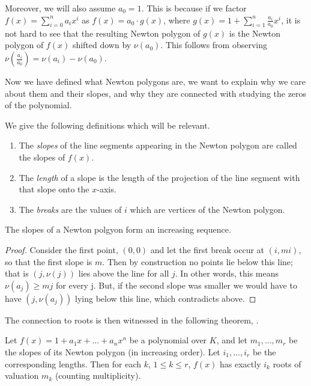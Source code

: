 Moreover, we will also assume $a_0 = 1$. This is because if we factor
$f(x) = \sum_{i = 0}^n a_i x^i$ as $f(x) = a_0 \cdot g(x)$, where
$ g(x) = 1 + \sum_{i=1}^n \frac{a_i}{a_0}x^i$, it is not hard to see that the resulting Newton
polygon of $g(x)$ is the Newton polygon of $f(x)$ shifted down by $\nu (a_0)$.
This follows from observing $\nu (\frac{a_i}{a_0}) = \nu(a_i) - \nu (a_0)$.

Now we have defined what Newton polygons are, we want to explain why we care about them and their
slopes, and why they are connected with studying the zeros of the polynomial.

We give the following definitions which will be relevant.
\begin{definition}
    \begin{enumerate}
        \item The \emph{slopes} of the line segments appearing in the Newton polygon are called the
        slopes of $f(x)$.
        \item The \emph{length} of a slope is the length of the projection of the line segment with
        that slope onto the $x$-axis.
        \item The \emph{breaks} are the values of $i$ which are vertices of the Newton polygon.
    \end{enumerate}
\end{definition}

\begin{theorem}
  The slopes of a Newton polgyon form an increasing sequence.
\end{theorem}

\begin{proof}
    Consider the first point, $(0,0)$ and let the first break occur at $(i,m i)$, so
    that the first slope is $m$. Then by construction no points lie below this line; that is
    $(j, \nu(j))$ lies above the line for all $j$. In other words, this means $\nu (a_j) \geq m j$
    for every j. But, if the second slope was smaller we would have to have $(j, \nu(a_j))$ lying
    below this line, which contradicts above.
\end{proof}

The connection to roots is then witnessed in the following theorem, \cite[Theorem~7.4.7]{Gouvea}.
\begin{theorem}
    \label{NPPoly}
    Let $f(x) = 1 + a_1 x + \dots + a_nx^n$ be a polynomial over $K$, and let $m_1, \dots, m_r$ be
    the slopes of its Newton polygon (in increasing order). Let $i_1, \dots, i_r$ be the
    corresponding lengths. Then for each $k$, $1 \leq k \leq r$, $f(x)$ has exactly $i_k$ roots of
    valuation $m_k$ (counting multiplicity).
\end{theorem}

